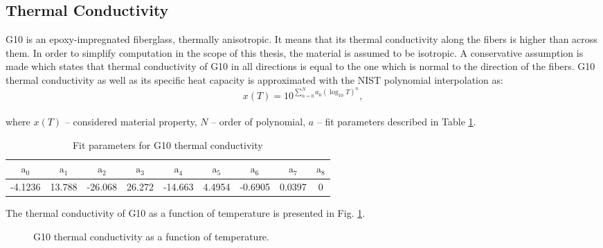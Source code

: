 
\subsection{Thermal Conductivity}
\label{subsection:thermal_conductivity_g10}

G10 is an epoxy-impregnated fiberglass, thermally anisotropic. It means that its thermal conductivity along the fibers is higher than across them. In order to simplify computation in the scope of this thesis, the material is assumed to be isotropic. A conservative assumption is made which states that thermal conductivity of G10 in all directions is equal to the one which is normal to the direction of the fibers.
G10 thermal conductivity as well as its specific heat capacity is approximated with the NIST polynomial interpolation as: 
\begin{equation}
    x(T) = 10^{\sum_{n=0}^{N} a_\text{n}(\log_\text{10}T)^{n}},
    \label{G10_polynomial_interpolation}
\end{equation}
\\
where $x(T)$ -- considered material property, $N$ -- order of polynomial, $a$ -- fit parameters described in Table \ref{table:nist_g10_k_parameters}.

\begin{table}[H]
    \caption{Fit parameters for G10 thermal conductivity} 
    \vspace{-1.em} 
    \fontsize{10}{10}
    \selectfont 
    \renewcommand{\arraystretch}{1.5}
    \begin{center}
    \begin{tabular}{ ccccccccc }  
    $\text{a}_0$ & $\text{a}_1$ & $\text{a}_2$ & $\text{a}_3$ & $\text{a}_4$ & $\text{a}_5$ & $\text{a}_6$ & $\text{a}_7$ & $\text{a}_8$ \\
    \hline
    -4.1236 & 13.788 & -26.068 & 26.272 & -14.663 & 4.4954 & -0.6905 & 0.0397 & 0 \\
    \hline 
    \end{tabular}
    \end{center}  
     \label{table:nist_g10_k_parameters} 
 \end{table}

The thermal conductivity of G10 as a function of temperature is presented in Fig. \ref{fig:g10_k_plot}.

\begin{figure}[H]
    \centering
    \caption{G10 thermal conductivity as a function of temperature.}
    \label{fig:g10_k_plot}
\end{figure}
 
